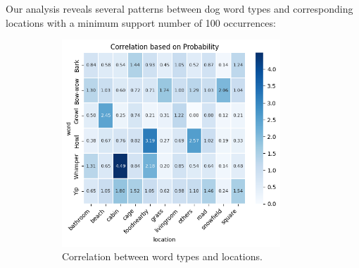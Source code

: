 
Our analysis reveals several patterns between dog word types and 
corresponding locations with a minimum support number of 100 occurrences: 

\begin{figure}[th]
\centering
\begin{subfigure}[t]{0.49\textwidth}
	\centering
	\includegraphics[width=0.9\textwidth]{images/sound_location_prior.png}
	\caption{Correlation between word types and locations.}
	\label{fig:sound_location}
\end{subfigure}
\begin{subfigure}[t]{0.49\textwidth}
	\centering

\end{subfigure}
\end{figure}
